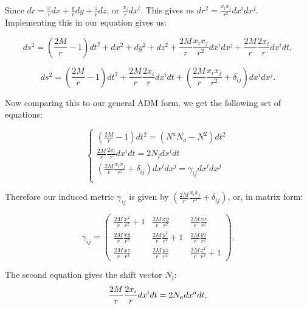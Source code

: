\documentclass[twoside, openright]{RadboudReport}
\begin{document}
Since $dr = \frac{x}{r}dx+\frac{y}{r}dy+\frac{z}{r}dz$, or $\frac{x_i}{r}dx^i$. This gives us $dr^2 = \frac{x_ix_j}{r^2}dx^idx^j$. Implementing this in our equation gives us:

\begin{equation}
     ds^2 = \left(\frac{2M}{r}-1\right)dt^2 + dx^2+dy^2+dz^2+\frac{2M}{r}\frac{x_ix_j}{r^2}dx^idx^j + \frac{2M}{r}\frac{2x_i}{r}dx^idt,
\end{equation}

\begin{equation}
    ds^2 = \left(\frac{2M}{r}-1\right)dt^2 + \frac{2M}{r}\frac{2x_i}{r}dx^idt +\left(\frac{2M}{r}\frac{x_ix_j}{r^2}+\delta_{ij}\right)dx^idx^j .
\end{equation}

Now comparing this to our general ADM form, we get the following set of equations:


\begin{equation}
    \begin{cases}
        \left(\frac{2M}{r}-1\right)dt^2= (N^aN_a-N^2)dt^2\\
        \frac{2M}{r}\frac{2x_i}{r}dx^idt = 2N_idx^idt\\
        \left(\frac{2M}{r}\frac{x_ix_j}{r^2}+\delta_{ij}\right)dx^idx^j = \gamma_{ij}dx^idx^j\\
    \end{cases}\,
\end{equation}

Therefore our induced metric $\gamma_{ij}$ is given by $ \left(\frac{2M}{r}\frac{x_ix_j}{r^2}+\delta_{ij}\right)$, or, in matrix form:

\begin{equation}
	\gamma_{ij}=
	\begin{pmatrix}
		\frac{2M}{r}\frac{x^2}{r^2}+1 & \frac{2M}{r}\frac{xy}{r^2} & \frac{2M}{r}\frac{xz}{r^2}\\
		\frac{2M}{r}\frac{xy}{r^2} & \frac{2M}{r}\frac{y^2}{r^2}+1 & \frac{2M}{r}\frac{yz}{r^2}\\
		\frac{2M}{r}\frac{xz}{r^2} & \frac{2M}{r}\frac{yz}{r^2} & \frac{2M}{r}\frac{z^2}{r^2}+1
	\end{pmatrix}.
\end{equation}


The second equation gives the shift vector $N_i$:
\begin{equation}
    \frac{2M}{r}\frac{2x_i}{r}dx^idt = 2N_adx^adt\\,
\end{equation}
\end{document}
